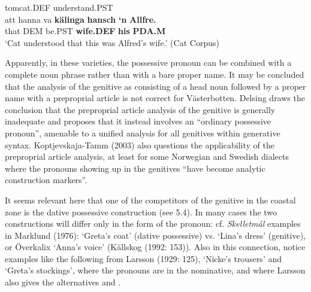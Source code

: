 tomcat.DEF  understand.PST\\ %


\ea\label{}
\gll att  hanna  va  \textbf{kälinga}\textbf{  hansch}\textbf{  ‘n}\textbf{  Allfre.}\\


that  DEM  be.PST  \textbf{wife.DEF} \textbf{his} \textbf{PDA.M} \\ %


‘Cat understood that this was Alfred’s wife.’ (Cat Corpus)
\z


Apparently, in these varieties, the possessive pronoun can be combined with a complete noun phrase rather than with a bare proper name. It may be concluded that the analysis of the genitive as consisting of a head noun followed by a proper name with a preproprial article is not correct for Västerbotten.  Delsing draws the conclusion that the preproprial article analysis of the genitive is generally inadequate and proposes that it instead involves an “ordinary possessive pronoun”, amenable to a unified analysis for all genitives within generative syntax. Koptjevskaja-Tamm (2003) also questions the applicability of the preproprial article analysis, at least for some Norwegian and Swedish dialects where the pronouns showing up in the genitives “have become analytic construction markers”. 

It seems relevant here that one of the competitors of the genitive in the coastal zone is the dative possessive construction (see 5.4). In many cases the two constructions will differ only in the form of the pronoun: cf. \textit{Skelletmål} examples in Marklund (1976):  ‘Greta’s coat’ (dative possessive) vs.   ‘Lina’s dress’ (genitive), or Överkalix  ‘Anna’s voice’ (Källskog (1992: 153)). Also in this connection, notice examples like the following from Larsson (1929: 125), ‘Nicke’s trousers’ and  ‘Greta’s stockings’, where the pronouns are in the nominative, and where Larsson also gives the alternatives  and .

